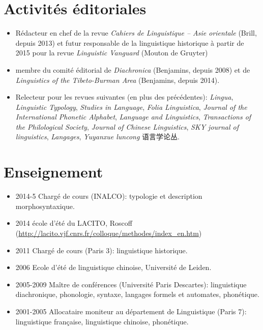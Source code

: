\documentclass[oldfontcommands,oneside,a4paper,11pt]{article}
\newcommand{\zh}[1]{{\cn #1}}
\begin{document}
 
  
  
 
\section*{Activités éditoriales}
\begin{itemize}
\item Rédacteur en chef de la revue \textit{Cahiers de Linguistique -- Asie orientale} (Brill, depuis 2013) et futur responsable de la linguistique historique à partir de 2015 pour la revue \textit{Linguistic Vanguard} (Mouton de Gruyter)
\item membre du comité éditorial de \textit{Diachronica} (Benjamins, depuis 2008) et de \textit{Linguistics of the Tibeto-Burman Area}  (Benjamins, depuis 2014).
\item Relecteur pour les revues suivantes (en plus des précédentes): \textit{Lingua}, \textit{Linguistic Typology}, \textit{Studies in Language}, \textit{Folia Linguistica}, \textit{Journal of the International Phonetic Alphabet},  \textit{Language and Linguistics}, \textit{Transactions of the Philological Society}, \textit{Journal of Chinese Linguistics}, \textit{SKY journal of linguistics}, \textit{Langages}, \textit{Yuyanxue luncong} \zh{语言学论丛}.
\end{itemize}

\section*{Enseignement}
\begin{itemize}
\item 2014-5 Chargé de cours (INALCO): typologie et description morphosyntaxique.
\item 2014 école d'été du LACITO, Roscoff (\url{http://lacito.vjf.cnrs.fr/colloque/methodes/index\_en.htm})
\item 2011 Chargé de cours (Paris 3): linguistique historique.
\item  2006 Ecole d'été de linguistique chinoise, Université de Leiden.
\item 2005-2009 Maître de conférences (Université Paris Descartes): linguistique diachronique, phonologie, syntaxe, langages formels et automates, phonétique.
\item 2001-2005 Allocataire moniteur au département de Linguistique (Paris 7): linguistique française, linguistique chinoise, phonétique.
\end{itemize}
\end{document}
